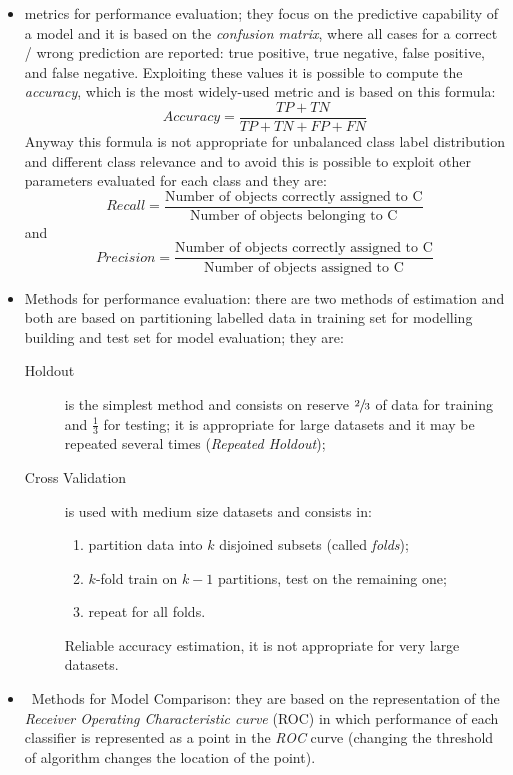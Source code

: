 \begin{itemize}
	\item
	metrics for performance evaluation; they focus on the predictive capability of a model and it is based on the \emph{confusion matrix}, where all cases for a correct / wrong prediction are reported: true positive, true negative, false positive, and false negative. Exploiting these values it is possible to compute the \emph{accuracy}, which is the most widely-used metric and is based on this formula:
	$$
		Accuracy = \frac{TP + TN}{TP + TN + FP + FN}
	$$
	Anyway this formula is not appropriate for unbalanced class label distribution and different class relevance and to avoid this is possible to exploit other parameters evaluated for each class and they are:
	$$
		Recall = \frac{\text{Number of objects correctly assigned to C}}{\text{Number of objects belonging to C}}
	$$
	and
	$$
		Precision = \frac{\text{Number of objects correctly assigned to C}}{\text{Number of objects assigned to C}}
	$$
	\item
	Methods for performance evaluation: there are two methods of estimation and both are based on partitioning labelled data in training set for modelling building and test set for model evaluation; they are:
	\begin{description}
		\item[Holdout] is the simplest method and consists on reserve $\sfrac{2}{3}$ of data for training and $\frac{1}{3}$ for testing; it is appropriate for large datasets and it may be repeated several times (\emph{Repeated Holdout});
		\item[Cross Validation] is used with medium size datasets and consists in:
		\begin{enumerate}
			\item
			partition data into $k$ disjoined subsets (called \emph{folds});
			\item
			$k$-fold train on $k - 1$ partitions, test on the remaining one;
			\item
			repeat for all folds.
		\end{enumerate}
		Reliable accuracy estimation, it is not appropriate for very large datasets.
	\end{description}
	\item\
	Methods for Model Comparison: they are based on the representation of the \emph{Receiver Operating Characteristic curve} (ROC) in which performance of each classifier is represented as a point in the \emph{ROC} curve (changing the threshold of algorithm changes the location of the point).
\end{itemize}